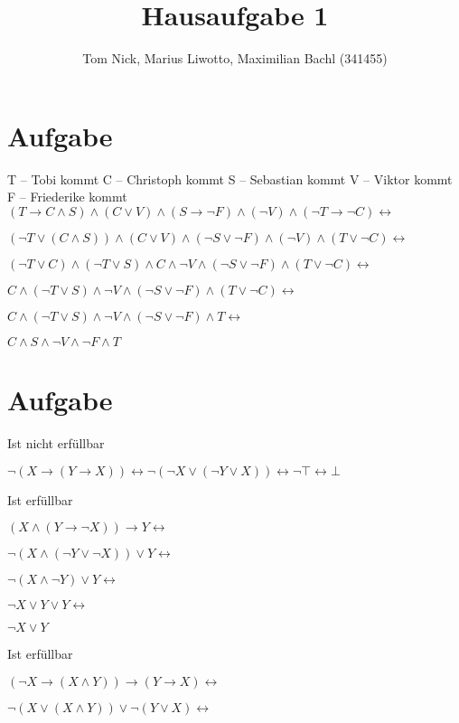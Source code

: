 \documentclass[11pt]{amsart}
\title{Hausaufgabe 1}
\author{Tom Nick, Marius Liwotto, Maximilian Bachl (341455)}
\begin{document}
\maketitle

\section{Aufgabe}
T -- Tobi kommt
C -- Christoph kommt
S -- Sebastian kommt
V -- Viktor kommt
F -- Friederike kommt
\\

$
(T \to C \land S) \land
(C \lor V) \land
(S \to \lnot F) \land
(\lnot V) \land
(\lnot T \to \lnot C) \leftrightarrow
$

$
(\lnot T \lor (C \land S)) \land
(C \lor V) \land
(\lnot S \lor \lnot F) \land
(\lnot V) \land
(T \lor \lnot C) \leftrightarrow
$

$
(\lnot T \lor C) \land (\lnot T \lor S) \land
C \land \lnot V \land
(\lnot S \lor \lnot F) \land
(T \lor \lnot C) \leftrightarrow
$

$
C \land (\lnot T \lor S) \land
\lnot V \land
(\lnot S \lor \lnot F) \land
(T \lor \lnot C) \leftrightarrow
$

$
C \land (\lnot T \lor S) \land
\lnot V \land
(\lnot S \lor \lnot F) \land
T \leftrightarrow
$

$
C \land S \land
\lnot V \land
\lnot F \land
T
$

\section{Aufgabe}

Ist nicht erfüllbar

$
\lnot(X \to (Y \to X)) \leftrightarrow \lnot(\lnot X \lor (\lnot Y \lor X)) \leftrightarrow \lnot\top \leftrightarrow \bot
$

Ist erfüllbar

$
(X \land (Y \to \lnot X)) \to Y \leftrightarrow
$

$
\lnot(X \land (\lnot Y \lor \lnot X)) \lor Y \leftrightarrow
$

$
\lnot(X \land \lnot Y) \lor Y \leftrightarrow
$

$
\lnot X \lor Y \lor Y \leftrightarrow
$

$
\lnot X \lor Y
$

Ist erfüllbar

$
(\lnot X \to (X \land Y)) \to (Y \to X) \leftrightarrow
$

$
\lnot (X \lor (X \land Y)) \lor \lnot(Y \lor X) \leftrightarrow
$
\end{document}
